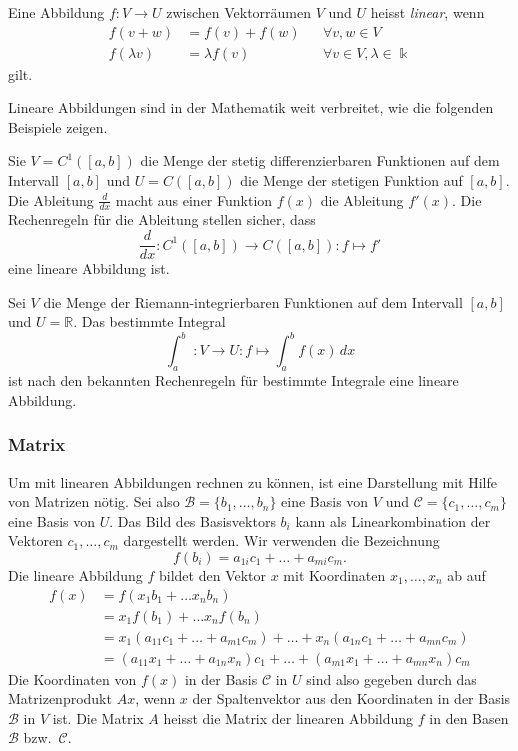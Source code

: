 \begin{definition}
%
Eine Abbildung $f\colon V\to U$ zwischen Vektorräumen $V$ und $U$
heisst {\em linear}, wenn
\[
\begin{aligned}
f(v+w) &= f(v) + f(w)&&\forall v,w\in V
\\
f(\lambda v) &= \lambda f(v) &&\forall v\in V,\lambda \in \Bbbk
\end{aligned}
\]
gilt.
\end{definition}

Lineare Abbildungen sind in der Mathematik weit verbreitet, wie die
folgenden Beispiele zeigen.

\begin{beispiel}
Sie $V=C^1([a,b])$ die Menge der stetig differenzierbaren Funktionen
auf dem Intervall $[a,b]$ und $U=C([a,b])$ die Menge der
stetigen Funktion auf $[a,b]$.
Die Ableitung $\frac{d}{dx}$ macht aus einer Funktion $f(x)$ die
Ableitung $f'(x)$.
Die Rechenregeln für die Ableitung stellen sicher, dass
\[
\frac{d}{dx}
\colon
C^1([a,b]) \to  C([a,b])
:
f \mapsto f'
\]
eine lineare Abbildung ist.
\end{beispiel}

\begin{beispiel}
Sei $V$ die Menge der Riemann-integrierbaren Funktionen auf dem
Intervall $[a,b]$ und $U=\mathbb{R}$.
Das bestimmte Integral
\[
\int_a^b \;\colon V \to U : f \mapsto \int_a^b f(x)\,dx
\]
ist nach den bekannten Rechenregeln für bestimmte Integrale
eine lineare Abbildung.
\end{beispiel}

\subsubsection{Matrix}
Um mit linearen Abbildungen rechnen zu können, ist eine Darstellung
mit Hilfe von Matrizen nötig.
Sei also $\mathcal{B}=\{b_1,\dots,b_n\}$ eine Basis von $V$ und
$\mathcal{C} = \{ c_1,\dots,c_m\}$ eine Basis von $U$.
Das Bild des Basisvektors $b_i$ kann als Linearkombination der
Vektoren $c_1,\dots,c_m$ dargestellt werden.
Wir verwenden die Bezeichnung
\[
f(b_i)
=
a_{1i} c_1 + \dots + a_{mi} c_m.
\]
Die lineare Abbildung $f$ bildet den Vektor $x$ mit Koordinaten
$x_1,\dots,x_n$ ab auf
\begin{align*}
f(x)
&=
f(x_1b_1  + \dots x_nb_n)
\\
&=
x_1 f(b_1) + \dots x_nf(b_n)
\\
&=
x_1(a_{11} c_1 + \dots + a_{m1} c_m)
+
\dots
+
x_n(a_{1n} c_1 + \dots + a_{mn} c_m)
\\
&=
( a_{11} x_1 + \dots + a_{1n} x_n ) c_1
+
\dots
+
( a_{m1} x_1 + \dots + a_{mn} x_n ) c_m
\end{align*}
Die Koordinaten von $f(x)$ in der Basis $\mathcal{C}$ in $U$ sind
also gegeben durch das Matrizenprodukt $Ax$, wenn $x$ der Spaltenvektor
aus den Koordinaten in der Basis $\mathcal{B}$ in $V$ ist.
Die Matrix $A$ heisst die Matrix der linearen Abbildung $f$ in
den Basen $\mathcal{B}$ bzw.~$\mathcal{C}$.
%

